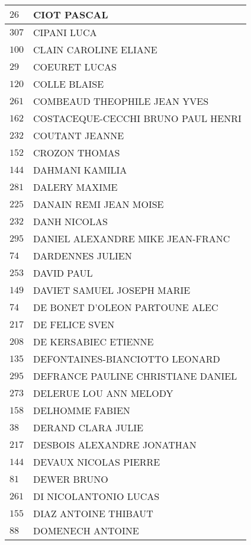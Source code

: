 \begin{xltabular}{\linewidth}{|l|X|}
    $26$ & CIOT PASCAL \\
    \hline
    $307$ & CIPANI LUCA \\
    \hline
    $100$ & CLAIN CAROLINE ELIANE \\
    \hline
    $29$ & COEURET LUCAS \\
    \hline
    $120$ & COLLE BLAISE \\
    \hline
    $261$ & COMBEAUD THEOPHILE JEAN YVES \\
    \hline
    $162$ & COSTACEQUE-CECCHI BRUNO PAUL HENRI \\
    \hline
    $232$ & COUTANT JEANNE \\
    \hline
    $152$ & CROZON THOMAS \\
    \hline
    $144$ & DAHMANI KAMILIA \\
    \hline
    $281$ & DALERY MAXIME \\
    \hline
    $225$ & DANAIN REMI JEAN MOISE \\
    \hline
    $232$ & DANH NICOLAS \\
    \hline
    $295$ & DANIEL ALEXANDRE MIKE JEAN-FRANC \\
    \hline
    $74$ & DARDENNES JULIEN \\
    \hline
    $253$ & DAVID PAUL \\
    \hline
    $149$ & DAVIET SAMUEL JOSEPH MARIE \\
    \hline
    $74$ & DE BONET D'OLEON PARTOUNE ALEC \\
    \hline
    $217$ & DE FELICE SVEN \\
    \hline
    $208$ & DE KERSABIEC ETIENNE \\
    \hline
    $135$ & DEFONTAINES-BIANCIOTTO LEONARD \\
    \hline
    $295$ & DEFRANCE PAULINE CHRISTIANE DANIEL \\
    \hline
    $273$ & DELERUE LOU ANN MELODY \\
    \hline
    $158$ & DELHOMME FABIEN \\
    \hline
    $38$ & DERAND CLARA JULIE \\
    \hline
    $217$ & DESBOIS ALEXANDRE JONATHAN \\
    \hline
    $144$ & DEVAUX NICOLAS PIERRE \\
    \hline
    $81$ & DEWER BRUNO \\
    \hline
    $261$ & DI NICOLANTONIO LUCAS \\
    \hline
    $155$ & DIAZ ANTOINE THIBAUT \\
    \hline
    $88$ & DOMENECH ANTOINE \\

\end{xltabular}
